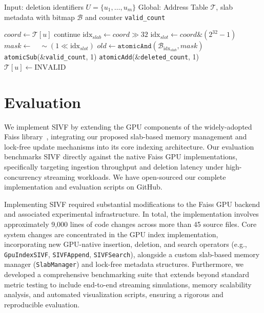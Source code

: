 \documentclass[sigconf,anonymous]{acmart}
\theoremstyle{plain}
\theoremstyle{definition}
\theoremstyle{remark}
\begin{document}
\begin{algorithm}[t]
\caption{Bitmap-based lazy eviction in SIVF}
\label{alg:sivf_delete}
\begin{algorithmic}[1]
\State Input: deletion identifiers $U=\{u_1,\ldots,u_m\}$
\State Global: Address Table $\mathcal{T}$, slab metadata with bitmap $\mathcal{B}$ and counter \texttt{valid\_count}

    \State $coord \gets \mathcal{T}[u]$
     \State continue \EndIf
    \State $\text{idx}_{slab} \gets coord \gg 32$
    \State $\text{idx}_{slot} \gets coord \mathbin{\&} (2^{32}-1)$
    \State $mask \gets \quad \sim(1 \ll \text{idx}_{slot})$
    \State $old \gets \texttt{atomicAnd}(\mathcal{B}_{\text{idx}_{slab}}, mask)$
        \State \texttt{atomicSub}(\&\texttt{valid\_count}, 1)
        \State \texttt{atomicAdd}(\&\texttt{deleted\_count}, 1)
        \State $\mathcal{T}[u] \gets \text{INVALID}$
    \EndIf
\EndFor
\end{algorithmic}
\end{algorithm}

\section{Evaluation}
\label{sec:evaluation}

We implement SIVF by extending the GPU components of the widely-adopted Faiss library~\cite{douze2024faiss}, integrating our proposed slab-based memory management and lock-free update mechanisms into its core indexing architecture. Our evaluation benchmarks SIVF directly against the native Faiss GPU implementations, specifically targeting ingestion throughput and deletion latency under high-concurrency streaming workloads. We have open-sourced our complete implementation and evaluation scripts on GitHub.

Implementing SIVF required substantial modifications to the Faiss GPU backend and associated experimental infrastructure. In total, the implementation involves approximately 9,000 lines of code changes across more than 45 source files. Core system changes are concentrated in the GPU index implementation, incorporating new GPU-native insertion, deletion, and search operators (e.g., \texttt{GpuIndexSIVF}, \texttt{SIVFAppend}, \texttt{SIVFSearch}), alongside a custom slab-based memory manager (\texttt{SlabManager}) and lock-free metadata structures. Furthermore, we developed a comprehensive benchmarking suite that extends beyond standard metric testing to include end-to-end streaming simulations, memory scalability analysis, and automated visualization scripts, ensuring a rigorous and reproducible evaluation.
\end{document}
